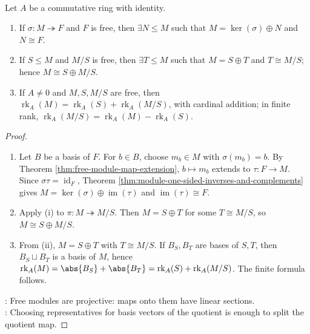 \begin{theorem} \label{thm:epimorphism-onto-free-module-splits} \\
Let $A$ be a commutative ring with identity.
\begin{enumerate}[label=(\roman*)]
\setlength{\itemsep}{0pt}
\item If $\sigma:M\twoheadrightarrow F$ and $F$ is free, then $\exists N\leq M$ such that $M=\ker(\sigma)\oplus N$ and $N\cong F$.
\item If $S\leq M$ and $M/S$ is free, then $\exists T\leq M$ such that $M=S\oplus T$ and $T\cong M/S$; hence $M\cong S\oplus M/S$.
\item If $A\neq0$ and $M,S,M/S$ are free, then $\operatorname{rk}_A(M)=\operatorname{rk}_A(S)+\operatorname{rk}_A(M/S)$, with cardinal addition; in finite rank, $\operatorname{rk}_A(M/S)=\operatorname{rk}_A(M)-\operatorname{rk}_A(S)$.
\end{enumerate}
\begin{proof}
\begin{enumerate}[label=(\roman*)]
\setlength{\itemsep}{0pt}
\item Let $B$ be a basis of $F$. For $b\in B$, choose $m_b\in M$ with $\sigma(m_b)=b$. By Theorem \ref{thm:free-module-map-extension}, $b\mapsto m_b$ extends to $\tau:F\to M$. Since $\sigma\tau=\operatorname{id}_F$, Theorem
\ref{thm:module-one-sided-inverses-and-complements} gives $M=\ker(\sigma)\oplus\operatorname{im}(\tau)$ and $\operatorname{im}(\tau)\cong F$.
\item Apply (i) to $\pi:M\twoheadrightarrow M/S$. Then $M=S\oplus T$ for some $T\cong M/S$, so $M\cong S\oplus M/S$.
\item From (ii), $M=S\oplus T$ with $T\cong M/S$. If $B_S,B_T$ are bases of $S,T$, then $B_S\sqcup B_T$ is a basis of $M$, hence $\operatorname{rk}_A(M)=\abs{B_S}+\abs{B_T} =\operatorname{rk}_A(S)+\operatorname{rk}_A(M/S)$. The finite formula follows.
\end{enumerate}
\noindent
{}: Free modules are projective: maps onto them have linear sections.\\
: Choosing representatives for basis vectors of the quotient is enough to split the quotient map.
\end{proof}
\end{theorem}

